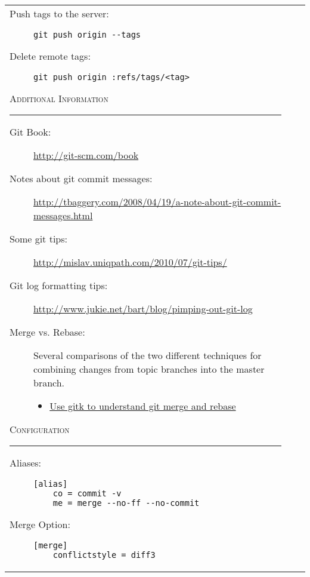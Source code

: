 \documentclass[landscape]{article}
\begin{document}
\begin{tabular*}{10.5in}{|p{2.9in}|p{2.9in}|p{2.9in}|}
\begin{flushleft}
\begin{description}
            \item[Push tags to the server:]
                {\verb!git push origin --tags!}
            \item[Delete remote tags:]
                {\verb!git push origin :refs/tags/<tag>!}
        \end{description}
        \textsc{Additional Information}
        \rule{2.9in}{.5pt}
        \small
        \begin{description}
            \item[Git Book:]{\url{http://git-scm.com/book}}
            \item[Notes about git commit messages:]
                {\url{http://tbaggery.com/2008/04/19/a-note-about-git-commit-messages.html}}
            \item[Some git tips:]
                {\url{http://mislav.uniqpath.com/2010/07/git-tips/}}
            \item[Git log formatting tips:]
                {\url{http://www.jukie.net/bart/blog/pimping-out-git-log}}
            \item[Merge vs. Rebase:]
                {Several comparisons of the two different techniques for
                combining changes from topic branches into the master branch.}
                \begin{itemize}
                    \item{\href{http://lostechies.com/joshuaflanagan/2010/09/03/use-gitk-to-understand-git-merge-and-rebase/}
                          {Use gitk to understand git merge and rebase}}
                \end{itemize}
        \end{description}
        \textsc{Configuration}
        \rule{2.9in}{.5pt}
        \small
        \begin{description}
            \item[Aliases:]
                {\begin{verbatim}
[alias]
    co = commit -v
    me = merge --no-ff --no-commit\end{verbatim}}
            \item[Merge Option:]
                {\begin{verbatim}
[merge]
	conflictstyle = diff3\end{verbatim}}
        \end{description}
    \end{flushleft}
\end{tabular*}
\end{document}

